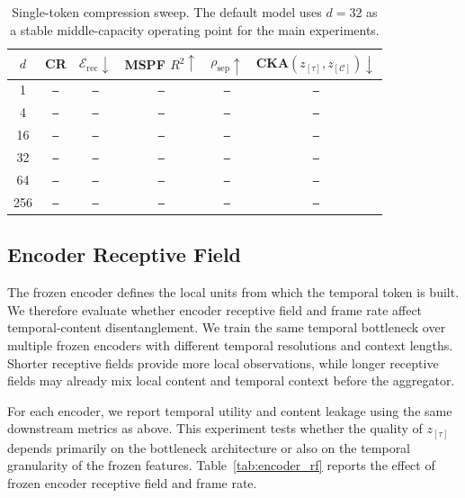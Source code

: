 \documentclass{article}
\newcommand{\zC}{z_{[\mathcal{C}]}}    %
\newcommand{\ztau}{z_{[\tau]}}          %
\newcommand{\res}{\texttt{--}}
\begin{document}
\begin{table}[t]
  \centering
  \setlength{\tabcolsep}{3.0pt}
  \caption{Single-token compression sweep.  The default model uses
    $d=32$ as a stable middle-capacity operating point for the main
    experiments.}
  \label{tab:compression}
  \begin{tabular}{cccccc}
    \toprule
    $d$ & CR
    & $\mathcal{E}_{\mathrm{rec}}\downarrow$
    & MSPF $R^2\uparrow$
    & $\rho_{\mathrm{sep}}\uparrow$
    & CKA$(\ztau,\zC)\downarrow$ \\
    \midrule
    1 & \res & \res & \res & \res & \res \\
    4 & \res & \res & \res & \res & \res \\
    16 & \res & \res & \res & \res & \res \\
    32 & \res & \res & \res & \res & \res \\
    64 & \res & \res & \res & \res & \res \\
    256 & \res & \res & \res & \res & \res \\
    \bottomrule
  \end{tabular}
\end{table}

\subsection{Encoder Receptive Field}
\label{ssec:exp_receptive_field}

The frozen encoder defines the local units from which the temporal
token is built.  We therefore evaluate whether encoder receptive
field and frame rate affect temporal-content disentanglement.  We
train the same temporal bottleneck over multiple frozen encoders
with different temporal resolutions and context lengths.  Shorter
receptive fields provide more local observations, while longer
receptive fields may already mix local content and temporal context
before the aggregator.

For each encoder, we report temporal utility and content leakage
using the same downstream metrics as above.  This experiment tests
whether the quality of $\ztau$ depends primarily on the bottleneck
architecture or also on the temporal granularity of the frozen
features.  Table~\ref{tab:encoder_rf} reports the effect of frozen
encoder receptive field and frame rate.
\end{document}
